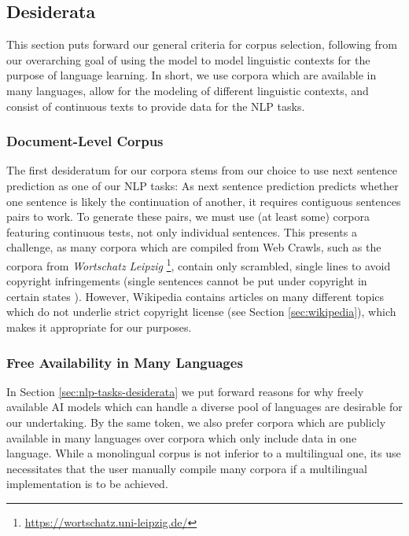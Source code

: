 \subsection{Desiderata}
This section puts forward our general criteria for corpus selection, following from our overarching goal of using the model to model linguistic contexts for the purpose of language learning.
In short, we use corpora which are available in many languages, allow for the modeling of different linguistic contexts, and consist of continuous texts to provide data for the NLP tasks.

\subsubsection{Document-Level Corpus} \label{sec:document-level-corpus}
The first desideratum for our corpora stems from our choice to use next sentence prediction as one of our NLP tasks:
As next sentence prediction predicts whether one sentence is likely the continuation of another, it requires contiguous sentences pairs to work.
To generate these pairs, we must use (at least some) corpora featuring continuous tests, not only individual sentences.
This presents a challenge, as many corpora which are compiled from Web Crawls, such as the corpora from \textit{Wortschatz Leipzig} \footnote{\url{https://wortschatz.uni-leipzig.de/}}, contain only scrambled, single lines to avoid copyright infringements (single sentences cannot be put under copyright in certain states \cite{goldhahnBuildingLargeMonolingual2012}).
However, Wikipedia contains articles on many different topics which do not underlie strict copyright license (see Section \ref{sec:wikipedia}), which makes it appropriate for our purposes.

\subsubsection{Free Availability in Many Languages}
In Section \ref{sec:nlp-tasks-desiderata} we put forward reasons for why freely available AI models which can handle a diverse pool of languages are desirable for our undertaking.
By the same token, we also prefer corpora which are publicly available in many languages over corpora which only include data in one language.
While a monolingual corpus is not inferior to a multilingual one, its use necessitates that the user manually compile many corpora if a multilingual implementation is to be achieved.

